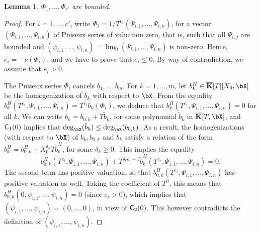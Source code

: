 \documentclass[12pt]{article}
\newtheorem{lemma}[definition]{Lemma}
\begin{document}
\begin{lemma}
   $\Phi_1,\dots,\Phi_{c'}$ are bounded.
\end{lemma}
\begin{proof}
  For $i=1,\dots,c'$, write $\Phi_i=1/T^{e_i}
  (\Psi_{i,1},\dots,\Psi_{i,n})$, for a vector
  $(\Psi_{i,1},\dots,\Psi_{i,n})$ of Puiseux series of valuation
  zero, that is, such that all $\Psi_{i,j}$ are bounded and
  $(\psi_{i,1},\dots,\psi_{i,n})=\lim_0(\Psi_{i,1},\dots,\Psi_{i,n})$
  is non-zero. Hence,
  $e_i=-\nu(\Phi_i)$, and we have to prove that $e_i \le 0$.  By way
  of contradiction, we assume that $e_i > 0$.

  The Puiseux series $\Phi_i$ cancels $b_1,\dots,b_m$. For
  $k=1,\dots,m$, let $b_k^H \in \KKbar[T][X_0,\bX]$ be the homogenization
  of $b_k$ with respect to $\bX$. From the equality
  $b_k^H(T^{e_i},\Psi_{i,1},\dots,\Psi_{i,n})=
  T^{e_i}b_k(\Phi_i)$, we deduce that
  $b_k^H(T^{e_i},\Psi_{i,1},\dots,\Psi_{i,n})=0$ for all $k$. We
  can write $b_k = b_{0,k} + T \tilde b_k$, for some polynomial
  $\tilde b_k$ in $\KKbar[T,\bX]$, and $\mathsf{C}_1(0)$ implies that
  $\deg_\bX(\tilde b_k) \le \deg_\bX(b_{0,k})$. As a result, the
  homogenizations (with respect to $\bX$) of $b_{k},b_{0,k}$ and $\tilde
  b_k$ satisfy a relation of the form $b^H_k = b_{0,k}^H +
  X_0^{\delta_k} T \tilde b^H_k$, for some $\delta_k \ge 0$. This
  implies the equality
  $$b_{0,k}^H(T^{e_i},\Psi_{i,1},\dots,\Psi_{i,n}) + T^{\delta_k
    e_i+1}\tilde b_k^H(T^{e_i},\Psi_{i,1},\dots,\Psi_{i,n})=0.$$
  The second term has positive valuation, so that
  $b_{0,k}^H(T^{e_i},\Psi_{i,1},\dots,\Psi_{i,n})$ has positive
  valuation as well. Taking the coefficient of $T^0$, this means 
  that $b_{0,k}^H(0,\psi_{i,1},\dots,\psi_{i,n})=0$ (since $e_i > 0$), which implies 
  that $(\psi_{i,1},\dots,\psi_{i,n})=(0,\dots,0)$, in view of $\mathsf{C}_2(0)$.
  This however contradicts the definition of $(\psi_{i,1},\dots,\psi_{i,n})$.
\end{proof}
\end{document}
